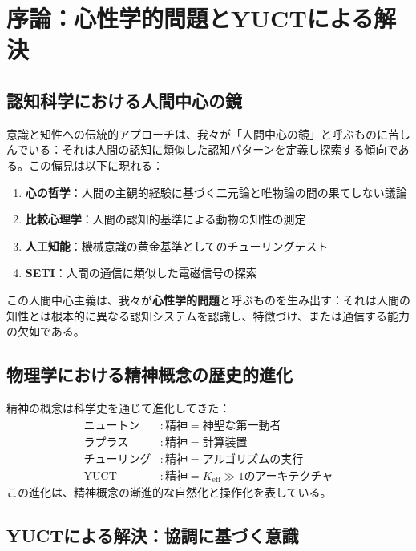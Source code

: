\documentclass[11pt,a4paper]{article}
\newcommand{\eff}{\mathrm{eff}}
\newcommand{\Ke}{K_{\eff}}
\begin{document}
	\tableofcontents
	
	\newpage
	
	\section{序論：心性学的問題とYUCTによる解決}
	
	\subsection{認知科学における人間中心の鏡}
	
	意識と知性への伝統的アプローチは、我々が「人間中心の鏡」と呼ぶものに苦しんでいる：それは人間の認知に類似した認知パターンを定義し探索する傾向である。この偏見は以下に現れる：
	\begin{enumerate}
		\item \textbf{心の哲学}：人間の主観的経験に基づく二元論と唯物論の間の果てしない議論
		\item \textbf{比較心理学}：人間の認知的基準による動物の知性の測定
		\item \textbf{人工知能}：機械意識の黄金基準としてのチューリングテスト
		\item \textbf{SETI}：人間の通信に類似した電磁信号の探索
	\end{enumerate}
	この人間中心主義は、我々が\textbf{心性学的問題}と呼ぶものを生み出す：それは人間の知性とは根本的に異なる認知システムを認識し、特徴づけ、または通信する能力の欠如である。
	
	\subsection{物理学における精神概念の歴史的進化}
	
	精神の概念は科学史を通じて進化してきた：
	\[
	\begin{aligned}
		\text{ニュートン} &: \text{精神} = \text{神聖な第一動者} \\
		\text{ラプラス} &: \text{精神} = \text{計算装置} \\
		\text{チューリング} &: \text{精神} = \text{アルゴリズムの実行} \\
		\text{YUCT} &: \text{精神} = \Ke \gg 1 \text{のアーキテクチャ}
	\end{aligned}
	\]
	この進化は、精神概念の漸進的な自然化と操作化を表している。
	
	\subsection{YUCTによる解決：協調に基づく意識}
	
\end{document}
